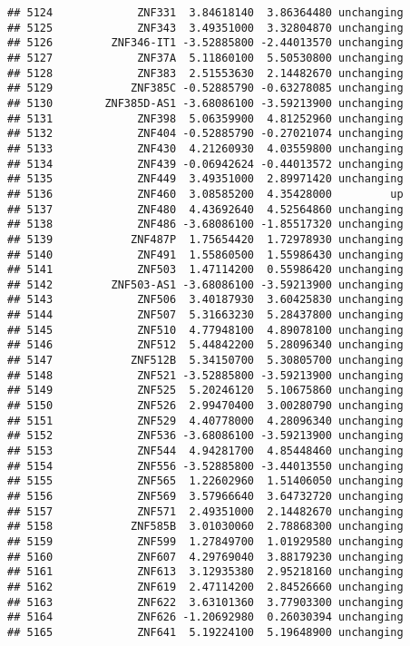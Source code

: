 \documentclass[]{article}
\begin{document}
\begin{verbatim}
## 5124             ZNF331  3.84618140  3.86364480 unchanging
## 5125             ZNF343  3.49351000  3.32804870 unchanging
## 5126         ZNF346-IT1 -3.52885800 -2.44013570 unchanging
## 5127             ZNF37A  5.11860100  5.50530800 unchanging
## 5128             ZNF383  2.51553630  2.14482670 unchanging
## 5129            ZNF385C -0.52885790 -0.63278085 unchanging
## 5130        ZNF385D-AS1 -3.68086100 -3.59213900 unchanging
## 5131             ZNF398  5.06359900  4.81252960 unchanging
## 5132             ZNF404 -0.52885790 -0.27021074 unchanging
## 5133             ZNF430  4.21260930  4.03559800 unchanging
## 5134             ZNF439 -0.06942624 -0.44013572 unchanging
## 5135             ZNF449  3.49351000  2.89971420 unchanging
## 5136             ZNF460  3.08585200  4.35428000         up
## 5137             ZNF480  4.43692640  4.52564860 unchanging
## 5138             ZNF486 -3.68086100 -1.85517320 unchanging
## 5139            ZNF487P  1.75654420  1.72978930 unchanging
## 5140             ZNF491  1.55860500  1.55986430 unchanging
## 5141             ZNF503  1.47114200  0.55986420 unchanging
## 5142         ZNF503-AS1 -3.68086100 -3.59213900 unchanging
## 5143             ZNF506  3.40187930  3.60425830 unchanging
## 5144             ZNF507  5.31663230  5.28437800 unchanging
## 5145             ZNF510  4.77948100  4.89078100 unchanging
## 5146             ZNF512  5.44842200  5.28096340 unchanging
## 5147            ZNF512B  5.34150700  5.30805700 unchanging
## 5148             ZNF521 -3.52885800 -3.59213900 unchanging
## 5149             ZNF525  5.20246120  5.10675860 unchanging
## 5150             ZNF526  2.99470400  3.00280790 unchanging
## 5151             ZNF529  4.40778000  4.28096340 unchanging
## 5152             ZNF536 -3.68086100 -3.59213900 unchanging
## 5153             ZNF544  4.94281700  4.85448460 unchanging
## 5154             ZNF556 -3.52885800 -3.44013550 unchanging
## 5155             ZNF565  1.22602960  1.51406050 unchanging
## 5156             ZNF569  3.57966640  3.64732720 unchanging
## 5157             ZNF571  2.49351000  2.14482670 unchanging
## 5158            ZNF585B  3.01030060  2.78868300 unchanging
## 5159             ZNF599  1.27849700  1.01929580 unchanging
## 5160             ZNF607  4.29769040  3.88179230 unchanging
## 5161             ZNF613  3.12935380  2.95218160 unchanging
## 5162             ZNF619  2.47114200  2.84526660 unchanging
## 5163             ZNF622  3.63101360  3.77903300 unchanging
## 5164             ZNF626 -1.20692980  0.26030394 unchanging
## 5165             ZNF641  5.19224100  5.19648900 unchanging

\end{verbatim}
\end{document}
